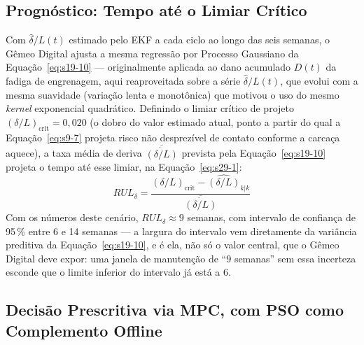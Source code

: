 \documentclass[12pt,a4paper]{article}
\numberwithin{equation}{section}
\numberwithin{table}{section}
\numberwithin{figure}{section}
\begin{document}
\subsection{Prognóstico: Tempo até o Limiar Crítico}

Com $\hat\delta/L(t)$ estimado pelo EKF a cada ciclo ao longo das seis semanas, o Gêmeo Digital ajusta a mesma regressão por Processo Gaussiano da Equação~\eqref{eq:s19-10} — originalmente aplicada ao dano acumulado $D(t)$ da fadiga de engrenagem, aqui reaproveitada sobre a série $\hat\delta/L(t)$, que evolui com a mesma suavidade (variação lenta e monotônica) que motivou o uso do mesmo \textit{kernel} exponencial quadrático. Definindo o limiar crítico de projeto $(\delta/L)_{\text{crit}} = 0{,}020$ (o dobro do valor estimado atual, ponto a partir do qual a Equação~\eqref{eq:s9-7} projeta risco não desprezível de contato conforme a carcaça aquece), a taxa média de deriva $\overline{\dot{(\delta/L)}}$ prevista pela Equação~\eqref{eq:s19-10} projeta o tempo até esse limiar, na Equação~\eqref{eq:s29-1}:
\begin{equation}\label{eq:s29-1}
 RUL_\delta = \frac{(\delta/L)_{\text{crit}} - \hat{(\delta/L)}_{k|k}}{\overline{\dot{(\delta/L)}}}
\end{equation}
Com os números deste cenário, $RUL_\delta \approx 9$ semanas, com intervalo de confiança de 95\,\% entre 6 e 14 semanas — a largura do intervalo vem diretamente da variância preditiva da Equação~\eqref{eq:s19-10}, e é ela, não só o valor central, que o Gêmeo Digital deve expor: uma janela de manutenção de ``9 semanas'' sem essa incerteza esconde que o limite inferior do intervalo já está a 6.

\subsection{Decisão Prescritiva via MPC, com PSO como Complemento Offline}
\end{document}
